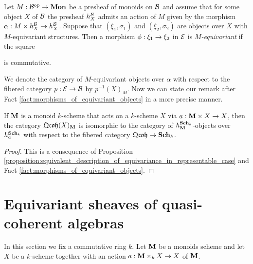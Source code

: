 \begin{definition}
Let $M:{\mathcal B}^{\mathrm{op}}\rightarrow \mathbf{Mon}$ be a presheaf of monoids on ${\mathcal B}$ and assume that for some object $X$ of ${\mathcal B}$ the presheaf $h^{{\mathcal B}}_X$ admits an action of $M$ given by the morphism $\alpha:M\times h^{{\mathcal B}}_X\rightarrow h^{{\mathcal B}}_X$. Suppose that $(\xi_1,\sigma_1)$ and $(\xi_2,\sigma_2)$ are objects over $X$ with $M$-equivariant structures. Then a morphism $\phi:\xi_1\rightarrow \xi_2$ in ${\mathcal E}$ is \textit{$M$-equivariant} if the square
\begin{center}
\end{center}
is commutative.
\end{definition}
\noindent
We denote the category of $M$-equivariant objects over $\alpha$ with respect to the fibered category $p:{\mathcal E}\rightarrow {\mathcal B}$ by $p^{-1}(X)_{M}$. Now we can state our remark after Fact \ref{fact:morphisms_of_equivariant_objects} in a more precise manner.

\begin{corollary}\label{corollary:isomorphism_between_equivariant_quasi_coherent_sheaves_and_equivariant_objects_in_fibered_category_of_quasi_coherent_sheaves}
If $\mathbf{M}$ is a monoid $k$-scheme that acts on a $k$-scheme $X$ via $a:\mathbf{M}\times X\rightarrow X$, then the category $\mathfrak{Qcoh}(X)_{\mathbf{M}}$ is isomorphic to the category of $h^{\mathbf{Sch}_k}_{\mathbf{M}}$-objects over $h^{\mathbf{Sch}_k}_a$ with respect to the fibered category $\mathfrak{Qcoh}\rightarrow \mathbf{Sch}_k$.
\end{corollary}
\begin{proof}
This is a consequence of Proposition \ref{proposition:equivalent_description_of_equivariance_in_representable_case} and Fact \ref{fact:morphisms_of_equivariant_objects}.
\end{proof}

\section{Equivariant sheaves of quasi-coherent algebras}
\noindent
In this section we fix a commutative ring $k$.    
Let $\mathbf{M}$ be a monoids scheme and let $X$ be a $k$-scheme together with an action $a:\mathbf{M}\times_kX\rightarrow X$ of $\mathbf{M}$.


